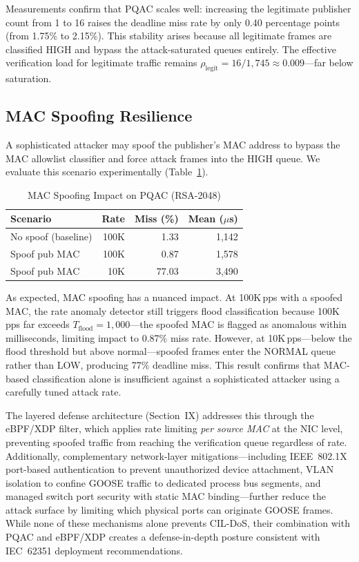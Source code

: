 \documentclass{ieeeaccess}
\begin{document}
Measurements confirm that PQAC scales well: increasing the legitimate publisher count from 1 to 16 raises the deadline miss rate by only 0.40 percentage points (from 1.75\% to 2.15\%). This stability arises because all legitimate frames are classified HIGH and bypass the attack-saturated queues entirely. The effective verification load for legitimate traffic remains $\rho_{\text{legit}} = 16/1{,}745 \approx 0.009$---far below saturation.

\subsection{MAC Spoofing Resilience}
A sophisticated attacker may spoof the publisher's MAC address to bypass the MAC allowlist classifier and force attack frames into the HIGH queue. We evaluate this scenario experimentally (Table~\ref{tab:mac_spoof}).

\begin{table}[t]
\caption{MAC Spoofing Impact on PQAC (RSA-2048)}
\label{tab:mac_spoof}
\centering
\small
\begin{tabular}{lrrr}
\toprule
\textbf{Scenario} & \textbf{Rate} & \textbf{Miss (\%)} & \textbf{Mean ($\mu$s)} \\
\midrule
No spoof (baseline)   & 100K & 1.33 & 1,142 \\
Spoof pub MAC         & 100K & 0.87 & 1,578 \\
Spoof pub MAC         & 10K  & 77.03 & 3,490 \\
\bottomrule
\end{tabular}
\end{table}

As expected, MAC spoofing has a nuanced impact. At 100K\,pps with a spoofed MAC, the rate anomaly detector still triggers flood classification because 100K\,pps far exceeds $T_{\text{flood}} = 1{,}000$---the spoofed MAC is flagged as anomalous within milliseconds, limiting impact to 0.87\% miss rate. However, at 10K\,pps---below the flood threshold but above normal---spoofed frames enter the NORMAL queue rather than LOW, producing 77\% deadline miss. This result confirms that MAC-based classification alone is insufficient against a sophisticated attacker using a carefully tuned attack rate.

The layered defense architecture (Section~IX) addresses this through the eBPF/XDP filter, which applies rate limiting \emph{per source MAC} at the NIC level, preventing spoofed traffic from reaching the verification queue regardless of rate. Additionally, complementary network-layer mitigations---including IEEE~802.1X port-based authentication to prevent unauthorized device attachment, VLAN isolation to confine GOOSE traffic to dedicated process bus segments, and managed switch port security with static MAC binding---further reduce the attack surface by limiting which physical ports can originate GOOSE frames. While none of these mechanisms alone prevents CIL-DoS, their combination with PQAC and eBPF/XDP creates a defense-in-depth posture consistent with IEC~62351 deployment recommendations.
\end{document}

